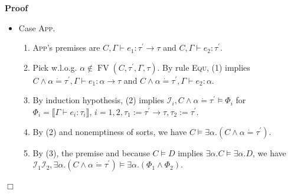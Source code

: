 \documentclass{article}
\newcommand{\assign}{:=}
\newcommand{\nin}{\not\in}
\newcommand{\tmname}[1]{\textsc{#1}}
\newcommand{\tmop}[1]{\ensuremath{\operatorname{#1}}}
\newenvironment{proof}{\noindent\textbf{Proof\ }}{\hspace*{\fill}$\Box$\medskip}
\begin{document}
\begin{proof}
\begin{itemize}
\begin{enumerate}
      \item Let $\alpha_1 \alpha_2 \# \tmop{FV} (C, \tau_1, \tau_2)$. Then,
      because sorts are nonempty, $C \vDash \exists \alpha_1 \alpha_2 . (C
      \wedge \alpha_1 \dot{=} \tau_1 \wedge \alpha_2 \dot{=} \tau_2)$.
      
      \item (1) and the premise implies $\mathcal{I}_1 \mathcal{I}_2, C \wedge
      \alpha_1 \dot{=} \tau_1 \wedge \alpha_2 \dot{=} \tau_2 \vDash \wedge_i
      \Phi_i \wedge \alpha_1 \rightarrow \alpha_2 \dot{=} \tau_1 \rightarrow
      \tau_2$.
      
      \item Combining (2) and (3), $\mathcal{I}_1 \mathcal{I}_2, C \vDash
      \exists \alpha_1 \alpha_2 . (\wedge_i \Phi_i \wedge \alpha_1 \rightarrow
      \alpha_2 \dot{=} \tau_1 \rightarrow \tau_2)$.
      
      \item By (1) and (4), $\mathcal{I}_1 \mathcal{I}_2, C \vDash \llbracket
      \Gamma \vdash \lambda \bar{c} : \tau \rrbracket$.
    \end{enumerate}
    \item Case {\tmname{App}}.
    \begin{enumerate}
      \item {\tmname{App}}'s premises are $C, \Gamma \vdash e_1 :
      \tau^{\prime} \rightarrow \tau$ and $C, \Gamma \vdash e_2 :
      \tau^{\prime}$.
      
      \item Pick w.l.o.g. $\alpha \nin \tmop{FV} (C, \tau^{\prime}, \Gamma,
      \tau)$. By rule {\tmname{Equ}}, (1) implies $C \wedge \alpha \dot{=}
      \tau^{\prime}, \Gamma \vdash e_1 : \alpha \rightarrow \tau$ and $C
      \wedge \alpha \dot{=} \tau^{\prime}, \Gamma \vdash e_2 : \alpha$.
      
      \item By induction hypothesis, (2) implies $\mathcal{I}_i, C \wedge
      \alpha \dot{=} \tau^{\prime} \vDash \Phi_i$ for $\Phi_i = \llbracket
      \Gamma \vdash e_i : \tau_i \rrbracket$, $i = 1, 2, \tau_1 \assign
      \tau^{\prime} \rightarrow \tau, \tau_2 \assign \tau^{\prime}$.
      
      \item By (2) and nonemptiness of sorts, we have $C \vDash \exists \alpha
      . (C \wedge \alpha \dot{=} \tau^{\prime})$.
      
      \item By (3), the premise and because $C \vDash D$ implies $\exists
      \alpha .C \vDash \exists \alpha .D$, we have $\mathcal{I}_1
      \mathcal{I}_2, \exists \alpha . (C \wedge \alpha \dot{=} \tau^{\prime})
      \vDash \exists \alpha . (\Phi_1 \wedge \Phi_2)$.
      

\end{enumerate}
\end{itemize}
\end{proof}
\end{document}
